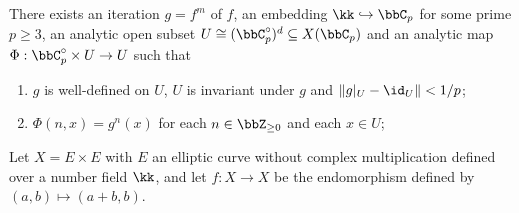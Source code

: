     \begin{theorem}\label{thm:Xie25_DML_for_adelic_general_points}

        There exists an iteration \(g = f^m\) of \(f\), an embedding \(\kk \hookrightarrow \bbC_p\) for some prime \(p\geq 3\),
        an analytic open subset \(U\cong (\bbC_p^{\circ})^d \subseteq X(\bbC_p)\) and an analytic map \(\Phi: \bbC_p^\circ \times U \to U\) such that
        \begin{enumerate}
            \item \(g\) is well-defined on \(U\), \(U\) is invariant under \(g\) and \(\|g|_U - \id_U\| < 1/p\);
            \item \(\Phi(n, x) = g^n(x)\) for each \(n \in \bbZ_{\geq 0}\) and each \(x \in U\);
        \end{enumerate}
    \end{theorem}


    \begin{example}\label{eg:interpolation_for_Jordan_block_of_elliptic_curves}
        Let \(X = E \times E\) with \(E\) an elliptic curve without complex multiplication defined over a number field \(\kk\),
        and let \(f \colon X \to X\) be the endomorphism defined by \((a,b) \mapsto (a + b, b)\).
    \end{example}

